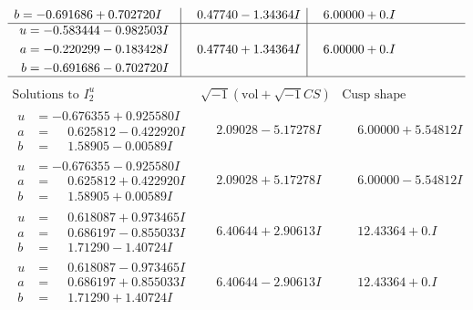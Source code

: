\documentclass[1p]{elsarticle_modified}
\theoremstyle{definition}
\newcommand{\I}{\sqrt{-1}}
\begin{document}
$$\begin{array}{c|c|c}
\begin{aligned}
b &= -0.691686 + 0.702720 I\end{aligned}
 & \phantom{-}0.47740 - 1.34364 I & \phantom{-}6.00000 + 0. I\phantom{ +0.000000I} \\ \hline\begin{aligned}
u &= -0.583444 - 0.982503 I \\
a &= -0.220299 - 0.183428 I \\
b &= -0.691686 - 0.702720 I\end{aligned}
 & \phantom{-}0.47740 + 1.34364 I & \phantom{-}6.00000 + 0. I\phantom{ +0.000000I}\\
 \hline 
 \end{array}$$\newpage$$\begin{array}{c|c|c}  
\text{Solutions to }I^u_{2}& \I (\text{vol} + \sqrt{-1}CS) & \text{Cusp shape}\\
 \hline 
\begin{aligned}
u &= -0.676355 + 0.925580 I \\
a &= \phantom{-}0.625812 - 0.422920 I \\
b &= \phantom{-}1.58905 - 0.00589 I\end{aligned}
 & \phantom{-}2.09028 - 5.17278 I & \phantom{-}6.00000 + 5.54812 I \\ \hline\begin{aligned}
u &= -0.676355 - 0.925580 I \\
a &= \phantom{-}0.625812 + 0.422920 I \\
b &= \phantom{-}1.58905 + 0.00589 I\end{aligned}
 & \phantom{-}2.09028 + 5.17278 I & \phantom{-}6.00000 - 5.54812 I \\ \hline\begin{aligned}
u &= \phantom{-}0.618087 + 0.973465 I \\
a &= \phantom{-}0.686197 - 0.855033 I \\
b &= \phantom{-}1.71290 - 1.40724 I\end{aligned}
 & \phantom{-}6.40644 + 2.90613 I & \phantom{-}12.43364 + 0. I\phantom{ +0.000000I} \\ \hline\begin{aligned}
u &= \phantom{-}0.618087 - 0.973465 I \\
a &= \phantom{-}0.686197 + 0.855033 I \\
b &= \phantom{-}1.71290 + 1.40724 I\end{aligned}
 & \phantom{-}6.40644 - 2.90613 I & \phantom{-}12.43364 + 0. I\phantom{ +0.000000I} \\ \hline\begin{aligned}

\end{aligned}
\end{array}$$
\end{document}
